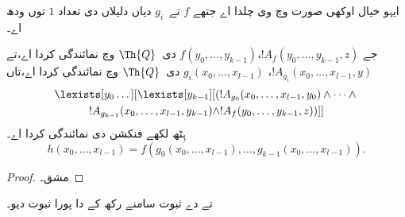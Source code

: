 \documentclass[../../../include/open-logic-section]{subfiles}
\begin{document}
ایہو خیال اوکھی صورت وچ وی چلدا اے جتھے $f$ تے~$g_i$ دیاں
دلیلاں دی تعداد $1$ توں ودھ اے۔

\begin{prop}
جے $!A_f(y_0, \dots, y_{k-1}, z)$،$f(y_0, \dots, y_{k-1})$
دی~$\Th{Q}$ وچ نمائندگی کردا اے،تے
$!A_{g_i}(x_0, \dots, x_{l-1}, y)$،
$g_i(x_0, \dots, x_{l-1})$ دی~$\Th{Q}$ وچ نمائندگی کردا اے،تاں
\begin{multline*}
  \lexists[y_0\dots][\lexists[y_{k-1}][(!A_{g_0}(x_0,\dots,x_{l-1},y_0) \land
      \dots \land {}\\
  !A_{g_{k-1}}(x_0,\dots,x_{l-1},y_{k-1}) \land !A_f(y_0,\dots,y_{k-1},z))]]
\end{multline*}
ہِٹھ لکھے فنکشن دی نمائندگی کردا اے۔
\[
h(x_0, \dots, x_{l-1}) = f(g_0(x_0, \dots, x_{l-1}), \dots, g_{k-1}(x_0,
\dots, x_{l-1})).
\]
\end{prop}

\begin{proof}
مشق۔
\end{proof}

\begin{prob}
 تے
 دے ثبوت سامنے رکھ کے
 دا پورا ثبوت دیو۔
\end{prob}
\end{document}
